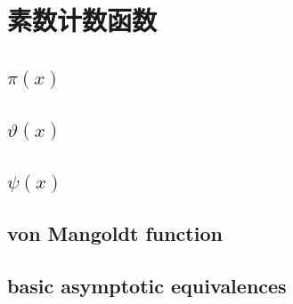 \section{素数计数函数}
\label{b3:sec:2701}


\subsection{\texorpdfstring{\(\pi(x)\)}{π(x)}}
\label{b3:subsec:270101}

\subsection{\texorpdfstring{\(\vartheta(x)\)}{(x)}}
\label{b3:subsec:270102}

\subsection{\texorpdfstring{\(\psi(x)\)}{(x)}}
\label{b3:subsec:270103}

\subsection{von Mangoldt function}
\label{b3:subsec:270104}

\subsection{basic asymptotic equivalences}
\label{b3:subsec:270105}


